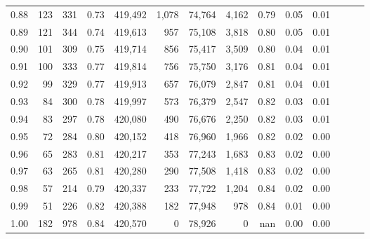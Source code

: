 \begin{tabular}{rrrrrrrrrrrrrr}
0.88 &     123 &    331 &  0.73 &  419,492 &    1,078 &  74,764 &   4,162 &  0.79 &  0.05 &      0.01 \\
0.89 &     121 &    344 &  0.74 &  419,613 &      957 &  75,108 &   3,818 &  0.80 &  0.05 &      0.01 \\
0.90 &     101 &    309 &  0.75 &  419,714 &      856 &  75,417 &   3,509 &  0.80 &  0.04 &      0.01 \\
0.91 &     100 &    333 &  0.77 &  419,814 &      756 &  75,750 &   3,176 &  0.81 &  0.04 &      0.01 \\
0.92 &      99 &    329 &  0.77 &  419,913 &      657 &  76,079 &   2,847 &  0.81 &  0.04 &      0.01 \\
0.93 &      84 &    300 &  0.78 &  419,997 &      573 &  76,379 &   2,547 &  0.82 &  0.03 &      0.01 \\
0.94 &      83 &    297 &  0.78 &  420,080 &      490 &  76,676 &   2,250 &  0.82 &  0.03 &      0.01 \\
0.95 &      72 &    284 &  0.80 &  420,152 &      418 &  76,960 &   1,966 &  0.82 &  0.02 &      0.00 \\
0.96 &      65 &    283 &  0.81 &  420,217 &      353 &  77,243 &   1,683 &  0.83 &  0.02 &      0.00 \\
0.97 &      63 &    265 &  0.81 &  420,280 &      290 &  77,508 &   1,418 &  0.83 &  0.02 &      0.00 \\
0.98 &      57 &    214 &  0.79 &  420,337 &      233 &  77,722 &   1,204 &  0.84 &  0.02 &      0.00 \\
0.99 &      51 &    226 &  0.82 &  420,388 &      182 &  77,948 &     978 &  0.84 &  0.01 &      0.00 \\
1.00 &     182 &    978 &  0.84 &  420,570 &        0 &  78,926 &       0 &   nan &  0.00 &      0.00 \\
\bottomrule
\end{tabular}
